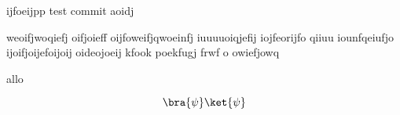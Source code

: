 \documentclass[letterpaper,oneside,final]{tufte-handout}
\begin{document}
ijfoeijpp 
test commit 
aoidj

weoifjwoqiefj oifjoieff oijfoweifjqwoeinfj iuuuuoiqjefij iojfeorijfo qiiuu      iounfqeiufjo ijoifjoijefoijoij  oideojoeij
kfook poekfugj frwf o
 owiefjowq\\
\begin{note}
    allo
\end{note}
\[
\bra{\psi} \ket{\psi} 
\]


 


\end{document}
